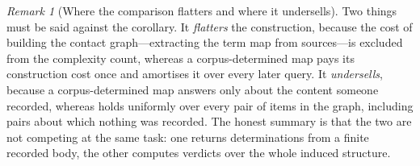 \documentclass[11pt,twocolumn,a4paper]{article}
\theoremstyle{dirthm}
\theoremstyle{definition}
\theoremstyle{remark}
\newtheorem{remark}[theorem]{Remark}
\begin{document}
\begin{remark}[Where the comparison flatters and where it undersells]
\label{rem:comparison-honest}
Two things must be said against the corollary. It \emph{flatters} the
construction, because the cost of building the contact graph---extracting the
term map from sources---is excluded from the complexity count, whereas a
corpus-determined map pays its construction cost once and amortises it over
every later query. It \emph{undersells}, because a corpus-determined map
answers only about the content someone recorded, whereas
 holds uniformly over every pair of items in the
graph, including pairs about which nothing was recorded. The honest summary is
that the two are not competing at the same task: one returns determinations
from a finite recorded body, the other computes verdicts over the whole
induced structure.
\end{remark}
\end{document}
